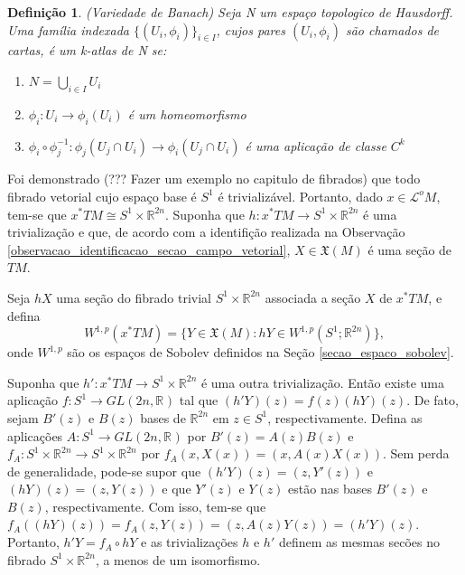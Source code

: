 \documentclass[12pt]{book}
\newtheorem{definicao}[teorema]{Definição}
\newcommand{\campossuaves}[1]{\mathfrak{X}(#1)}
\newcommand{\circulo}{S^{1}}
\newcommand{\espacosobolev}[1]{W^{1,p}(#1)}
\newcommand{\espacosobolevcontradominio}[2]{W^{1,p}(#1;#2)}
\newcommand{\generalgroup}[2]{GL(#1, #2)}
\newcommand{\generalgroupreal}[1]{\generalgroup{#1}{\real{}}}
\newcommand{\pullbackfibradotangente}[2]{#1^{*}T#2}
\newcommand{\pullbackfibradotangenteM}[1]{\pullbackfibradotangente{#1}{M}}
\newcommand{\real}[1]{\mathbb{R}^{#1}}
\newcommand{\lacocontrateis}{\mathcal{L}^{o}M}
\newcommand{\alerta}[1]{{\color{red}#1}}
\begin{document}
	\begin{definicao}
		(Variedade de Banach) Seja N um espaço topologico de Hausdorff. Uma família indexada $\{(U_{i}, \phi_{i})\}_{i \in I}$, cujos pares $(U_{i}, \phi_{i})$ são chamados de cartas, é um k-atlas de N se:
		\begin{enumerate}
			\item $N=\bigcup_{i\in I} U_{i}$
			\item $\phi_{i}:U_{i} \to \phi_{i}(U_{i})$ é um homeomorfismo
			\item $\phi_{i}\circ \phi_{j}^{-1}: \phi_{j}(U_{j}\cap U_{i}) \to \phi_{i}(U_{j}\cap U_{i}) $ é uma aplicação de classe $C^{k}$
		\end{enumerate}
	\end{definicao}
	
	Foi demonstrado \alerta{(??? Fazer um exemplo no capitulo de fibrados)} que todo fibrado vetorial cujo espaço base é $\circulo$ é trivializável. Portanto, dado $x\in\lacocontrateis$, tem-se que $\pullbackfibradotangenteM{x} \cong \circulo\times \real{2n}$. Suponha que $h:\pullbackfibradotangenteM{x} \to \circulo\times \real{2n}$ é uma trivialização e que, de acordo com a identifição realizada na Observação \ref{observacao_identificacao_secao_campo_vetorial}, $X \in \campossuaves{M}$ é uma seção de $TM$. 
	
	Seja $hX$ uma seção do fibrado trivial $\circulo\times \real{2n}$ associada a seção $X$ de $\pullbackfibradotangenteM{x}$, e defina 
	$$
	\espacosobolev{\pullbackfibradotangenteM{x}} = \{Y \in \campossuaves{M} : hY\in \espacosobolevcontradominio{\circulo}{\real{2n}}\},
	$$ 
	onde $W^{1,p}$ são os espaços de Sobolev definidos na Seção \ref{secao_espaco_sobolev}.
	
	Suponha que $h':\pullbackfibradotangenteM{x} \to \circulo\times \real{2n}$ é uma outra trivialização. Então existe uma aplicação $f:\circulo\to \generalgroupreal{2n}$ tal que $(h'Y)(z) = f(z)(hY)(z)$. De fato, sejam $B'(z)$ e $B(z)$ 
	bases de $\real{2n}$ em $z\in \circulo$, respectivamente. Defina as aplicações $A:\circulo \to \generalgroupreal{2n}$ por $B'(z)=A(z)B(z)$ e $f_{A}:\circulo\times \real{2n}\to \circulo\times \real{2n}$ por $f_{A}(x, X(x))=(x, A(x)X(x))$.  Sem perda de generalidade, pode-se supor que $(h'Y)(z) = (z, Y'(z))$ e $(hY)(z) = (z, Y(z))$ e que $Y'(z)$ e $Y(z)$ estão nas bases $B'(z)$ e $B(z)$, respectivamente. Com isso, tem-se que $f_{A}((hY)(z)) = f_{A}(z, Y(z)) = (z, A(z)Y(z)) = (h'Y)(z)$. Portanto, $h'Y = f_{A}\circ hY$ e as trivializações $h$ e $h'$ definem as mesmas secões no fibrado $\circulo\times \real{2n}$, a menos de um isomorfismo.
	
\end{document}
